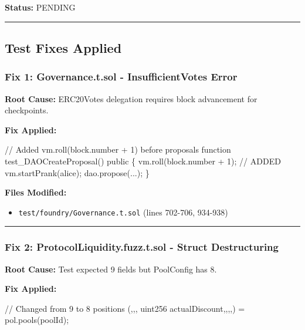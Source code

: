\documentclass[
]{article}
\newenvironment{Shaded}{}{}
\newcommand{\NormalTok}[1]{#1}
\providecommand{\tightlist}{%
  \setlength{\itemsep}{0pt}\setlength{\parskip}{0pt}}
\begin{document}
\textbf{Status:} PENDING

\begin{center}\rule{0.5\linewidth}{0.5pt}\end{center}

\subsection{Test Fixes Applied}\label{test-fixes-applied}

\subsubsection{Fix 1: Governance.t.sol - InsufficientVotes
Error}\label{fix-1-governancetsol---insufficientvotes-error}

\textbf{Root Cause:} ERC20Votes delegation requires block advancement
for checkpoints.

\textbf{Fix Applied:}

\begin{Shaded}
\begin{Highlighting}[]
\NormalTok{// Added vm.roll(block.number + 1) before proposals}
\NormalTok{function test\_DAOCreateProposal() public \{}
\NormalTok{    vm.roll(block.number + 1);  // ADDED}
\NormalTok{    vm.startPrank(alice);}
\NormalTok{    dao.propose(...);}
\NormalTok{\}}
\end{Highlighting}
\end{Shaded}

\textbf{Files Modified:}

\begin{itemize}
\tightlist
\item
  \texttt{test/foundry/Governance.t.sol} (lines 702-706, 934-938)
\end{itemize}

\begin{center}\rule{0.5\linewidth}{0.5pt}\end{center}

\subsubsection{Fix 2: ProtocolLiquidity.fuzz.t.sol - Struct
Destructuring}\label{fix-2-protocolliquidityfuzztsol---struct-destructuring}

\textbf{Root Cause:} Test expected 9 fields but PoolConfig has 8.

\textbf{Fix Applied:}

\begin{Shaded}
\begin{Highlighting}[]
\NormalTok{// Changed from 9 to 8 positions}
\NormalTok{(,,, uint256 actualDiscount,,,,) = pol.pools(poolId);}
\end{Highlighting}
\end{Shaded}
\end{document}

